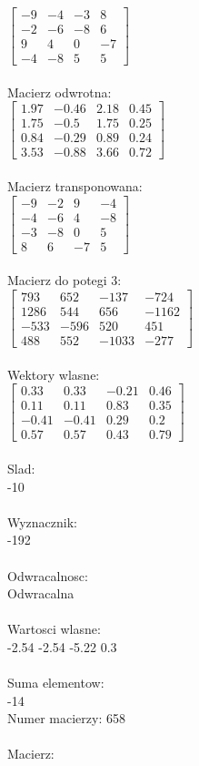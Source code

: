 \documentclass[a4paper,12pt]{article}
\begin{document}
$\begin{bmatrix} -9&-4&-3&8\\-2&-6&-8&6\\9&4&0&-7\\-4&-8&5&5 \end{bmatrix}$
\\
\\
Macierz odwrotna:\\

$\begin{bmatrix} 1.97&-0.46&2.18&0.45\\1.75&-0.5&1.75&0.25\\0.84&-0.29&0.89&0.24\\3.53&-0.88&3.66&0.72 \end{bmatrix}$
\\
\\
Macierz transponowana:\\

$\begin{bmatrix} -9&-2&9&-4\\-4&-6&4&-8\\-3&-8&0&5\\8&6&-7&5 \end{bmatrix}$
\\
\\
Macierz do potegi 3:\\

$\begin{bmatrix} 793&652&-137&-724\\1286&544&656&-1162\\-533&-596&520&451\\488&552&-1033&-277 \end{bmatrix}$
\\
\\
Wektory wlasne:\\

$\begin{bmatrix} 0.33&0.33&-0.21&0.46\\0.11&0.11&0.83&0.35\\-0.41&-0.41&0.29&0.2\\0.57&0.57&0.43&0.79 \end{bmatrix}$
\\
\\
Slad:\\
-10
\\
\\
Wyznacznik:\\
-192
\\
\\
Odwracalnosc:\\
Odwracalna
\\
\\
Wartosci wlasne:\\
-2.54 -2.54 -5.22 0.3
\\
\\
Suma elementow:\\
-14
\\
\newpage
Numer macierzy:
658
\\
\\
Macierz:\\
\end{document}
